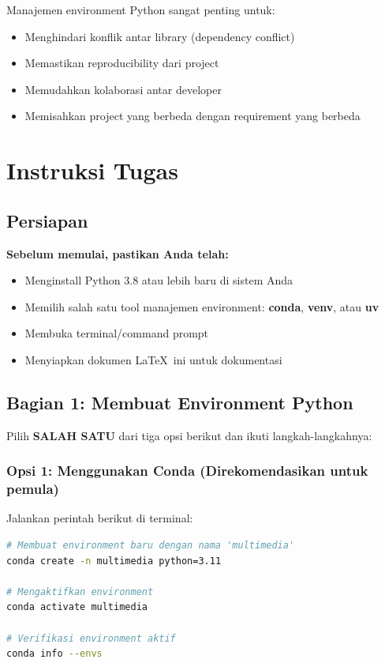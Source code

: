 \documentclass[11pt,a4paper]{article}
\begin{document}
Manajemen environment Python sangat penting untuk:
\begin{itemize}
    \item Menghindari konflik antar library (dependency conflict)
    \item Memastikan reproducibility dari project
    \item Memudahkan kolaborasi antar developer
    \item Memisahkan project yang berbeda dengan requirement yang berbeda
\end{itemize}

\section{Instruksi Tugas}

\subsection{Persiapan}
\textbf{Sebelum memulai, pastikan Anda telah:}
\begin{itemize}
    \item Menginstall Python 3.8 atau lebih baru di sistem Anda
    \item Memilih salah satu tool manajemen environment: \textbf{conda}, \textbf{venv}, atau \textbf{uv}
    \item Membuka terminal/command prompt
    \item Menyiapkan dokumen \LaTeX\ ini untuk dokumentasi
\end{itemize}

\subsection{Bagian 1: Membuat Environment Python}
Pilih \textbf{SALAH SATU} dari tiga opsi berikut dan ikuti langkah-langkahnya:

\subsubsection{Opsi 1: Menggunakan Conda (Direkomendasikan untuk pemula)}
Jalankan perintah berikut di terminal:

\begin{lstlisting}[language=bash, caption=Membuat environment dengan Conda]
# Membuat environment baru dengan nama 'multimedia'
conda create -n multimedia python=3.11

# Mengaktifkan environment
conda activate multimedia

# Verifikasi environment aktif
conda info --envs
\end{lstlisting}
\end{document}
